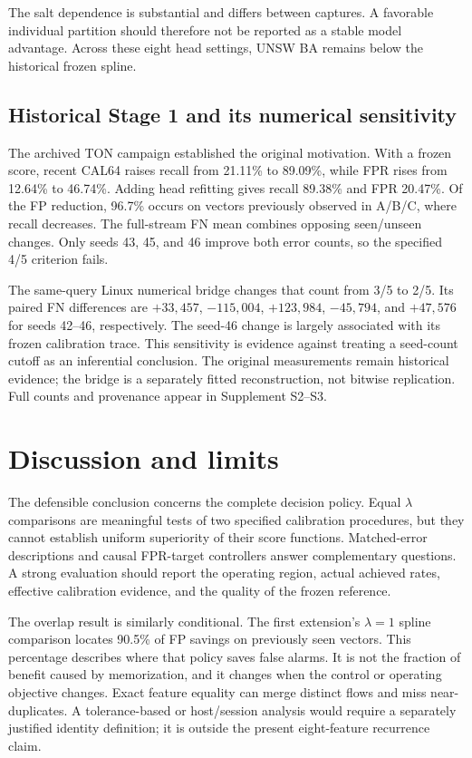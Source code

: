 
The salt dependence is substantial and differs between captures. A favorable individual partition should therefore not be reported as a stable model advantage. Across these eight head settings, UNSW BA remains below the historical frozen spline.

\subsection{Historical Stage 1 and its numerical sensitivity}
The archived TON campaign established the original motivation. With a frozen score, recent CAL64 raises recall from 21.11\% to 89.09\%, while FPR rises from 12.64\% to 46.74\%. Adding head refitting gives recall 89.38\% and FPR 20.47\%. Of the FP reduction, 96.7\% occurs on vectors previously observed in A/B/C, where recall decreases. The full-stream FN mean combines opposing seen/unseen changes. Only seeds 43, 45, and 46 improve both error counts, so the specified 4/5 criterion fails.

The same-query Linux numerical bridge changes that count from 3/5 to 2/5. Its paired FN differences are $+33{,}457$, $-115{,}004$, $+123{,}984$, $-45{,}794$, and $+47{,}576$ for seeds 42--46, respectively. The seed-46 change is largely associated with its frozen calibration trace. This sensitivity is evidence against treating a seed-count cutoff as an inferential conclusion. The original measurements remain historical evidence; the bridge is a separately fitted reconstruction, not bitwise replication. Full counts and provenance appear in Supplement S2--S3.

\section{Discussion and limits}
The defensible conclusion concerns the complete decision policy. Equal $\lambda$ comparisons are meaningful tests of two specified calibration procedures, but they cannot establish uniform superiority of their score functions. Matched-error descriptions and causal FPR-target controllers answer complementary questions. A strong evaluation should report the operating region, actual achieved rates, effective calibration evidence, and the quality of the frozen reference.

The overlap result is similarly conditional. The first extension's $\lambda=1$ spline comparison locates 90.5\% of FP savings on previously seen vectors. This percentage describes where that policy saves false alarms. It is not the fraction of benefit caused by memorization, and it changes when the control or operating objective changes. Exact feature equality can merge distinct flows and miss near-duplicates. A tolerance-based or host/session analysis would require a separately justified identity definition; it is outside the present eight-feature recurrence claim.

